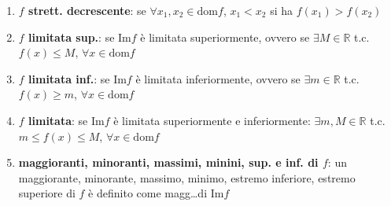 \documentclass[a4paper]{article}
\newcommand\dom{\text{dom}}
\newcommand\Img{\text{Im}}
\begin{document}
\begin{enumerate}
	\item \textbf{\(f\) strett. decrescente}: se \(\forall x_1, x_2 \in \dom f\), \(x_1 < x_2\) si ha \(f(x_1) > f(x_2)\)
	\item \textbf{\(f\) limitata sup.}: se \(\Img f\) è limitata superiormente, ovvero se \(\exists M \in \mathbb{R}\) t.c. \(f(x) \leq M\), \(\forall x \in \dom f\)
	\item \textbf{\(f\) limitata inf.}: se \(\Img f\) è limitata inferiormente, ovvero se \(\exists m \in \mathbb{R}\) t.c. \(f(x) \geq m\), \(\forall x \in \dom f\)
	\item \textbf{\(f\) limitata}: se \(\Img f\) è limitata superiormente e inferiormente: \(\exists m, M \in \mathbb{R}\) t.c. \(m \leq f(x) \leq M\), \(\forall x \in \dom f\)
	\item \textbf{maggioranti, minoranti, massimi, minini, sup. e inf. di \(f\)}: un maggiorante, minorante, massimo, minimo, estremo inferiore, estremo superiore di \(f\) è definito come magg\dots di \(\Img f\)
\end{enumerate}
\end{document}
